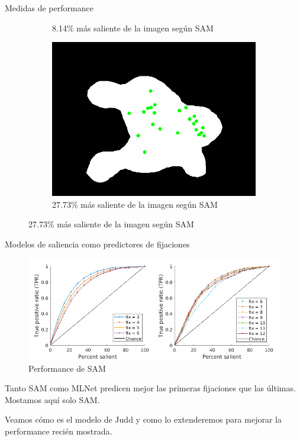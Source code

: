 \documentclass[compress]{beamer}
\begin{document}
\begin{frame}{Medidas de performance}
\begin{figure}[b]
\begin{subfigure}[t]{0.3\textwidth}
        \caption{\footnotesize 8.14\% más saliente de la imagen según SAM} \label{fig:example-salient-percent-8-14}
    \end{subfigure}
	\hfill
	\begin{subfigure}[t]{0.3\textwidth}
        \centering
        \includegraphics[width=\linewidth]{images/example-salient-percent-27-73.png} 
        \caption{\footnotesize
27.73\% más saliente de la imagen según SAM} \label{fig:example-salient-percent-27-73}
    \end{subfigure}
\end{figure}

\end{frame}

\begin{frame}{Modelos de saliencia como predictores de fijaciones}

\begin{figure}
\includegraphics[width=\linewidth]{images/sam_all_fix_small.png} 
\caption{Performance de SAM}
\end{figure}

Tanto SAM como MLNet predicen mejor las primeras fijaciones que las últimas. Mostamos aquí solo SAM.

\bigskip

Veamos cómo es el modelo de Judd y como lo extenderemos para mejorar la performance recién mostrada.

\end{frame}
\end{document}
